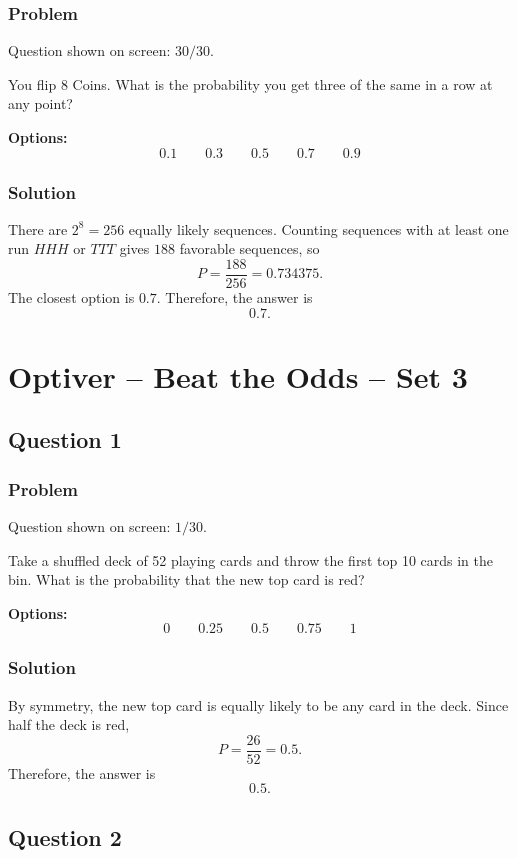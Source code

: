 \documentclass[12pt]{article}
\begin{document}
\subsubsection{Problem}
Question shown on screen: \(30/30\).

You flip 8 Coins. What is the probability you get three of the same in a row at any point?

\noindent\textbf{Options:}
\[
\boxed{0.1}
\qquad
\boxed{0.3}
\qquad
\boxed{0.5}
\qquad
\boxed{0.7}
\qquad
\boxed{0.9}
\]

\subsubsection{Solution}
There are \(2^8=256\) equally likely sequences. Counting sequences with at least one run \(HHH\) or \(TTT\) gives \(188\) favorable sequences, so
\[
P=\frac{188}{256}=0.734375.
\]
The closest option is \(0.7\). Therefore, the answer is
\[
\boxed{0.7}.
\]

\newpage
\section{Optiver -- Beat the Odds -- Set 3}

\subsection{Question 1}
\subsubsection{Problem}
Question shown on screen: \(1/30\).

Take a shuffled deck of 52 playing cards and throw the first top 10 cards in the bin. What is the probability that the new top card is red?

\noindent\textbf{Options:}
\[
\boxed{0}
\qquad
\boxed{0.25}
\qquad
\boxed{0.5}
\qquad
\boxed{0.75}
\qquad
\boxed{1}
\]

\subsubsection{Solution}
By symmetry, the new top card is equally likely to be any card in the deck. Since half the deck is red,
\[
P=\frac{26}{52}=0.5.
\]
Therefore, the answer is
\[
\boxed{0.5}.
\]

\subsection{Question 2}
\end{document}
